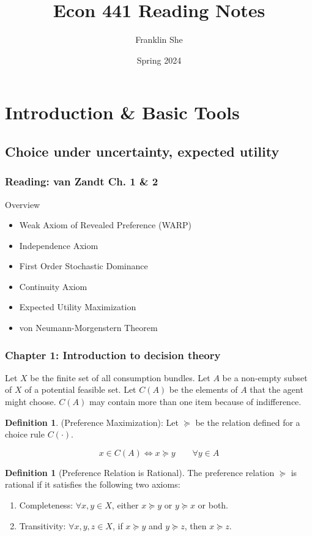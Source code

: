 \documentclass[12pt]{article}
\title{Econ 441 Reading Notes}
\author{Franklin She}
\date{Spring 2024}
\theoremstyle{definition}
\newtheorem{definition}[theorem]{Definition}
\theoremstyle{remark}
\begin{document}
\maketitle

\section{Introduction \& Basic Tools}

\subsection{Choice under uncertainty, expected utility}

\subsubsection{Reading: van Zandt Ch. 1 \& 2}

Overview
\begin{itemize}
    \item Weak Axiom of Revealed Preference (WARP)
    \item Independence Axiom
    \item First Order Stochastic Dominance
    \item Continuity Axiom
    \item Expected Utility Maximization
    \item von Neumann-Morgenstern Theorem
\end{itemize}

\subsubsection{Chapter 1: Introduction to decision theory}

Let $X$ be the finite set of all consumption bundles. Let $A$ be a non-empty subset of $X$ of a potential feasible set. Let $C(A)$ be the elements of $A$ that the agent might choose. $C(A)$ may contain more than one item because of indifference.

\begin{definition}(Preference Maximization): Let $\succeq$ be the relation defined for a choice rule $C(\cdot)$.

    \[
        x \in C(A) \iff x \succeq y \qquad \forall y \in A
    \]

\end{definition}
\begin{definition}[Preference Relation is Rational]
    The preference relation $\succeq$ is rational if it satisfies the following two axioms:
    \begin{enumerate}
        \item Completeness: $\forall x, y \in X$, either $x \succeq y$ or $y \succeq x$ or both.
        \item Transitivity: $\forall x, y, z \in X$, if $x \succeq y$ and $y \succeq z$, then $x \succeq z$.
    \end{enumerate}
\end{definition}
\end{document}
